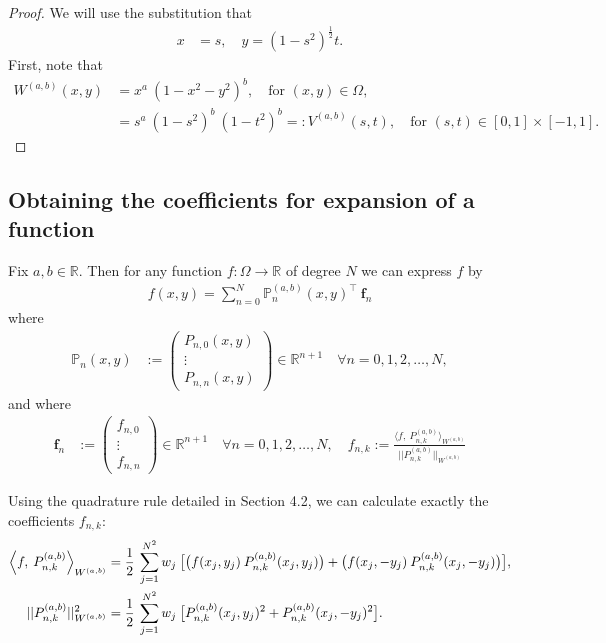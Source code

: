 \documentclass[11pt, oneside]{article}   	%
\newcommand{\half}{\frac{1}{2}}
\newcommand{\R}{\mathbb{R}}
\newcommand{\bigP}{\mathbb{P}}
\newcommand{\Pnk}{P_{n,k}}
\begin{document}
\begin{proof}
We will use the substitution that
\begin{align}
x &= s, \quad y = (1-s^2)^\half t.
\end{align}
First, note that
\begin{align}
W^{(a,b)}(x,y) &= x^a \: (1-x^2-y^2)^b, \quad \text{for } (x,y) \in \Omega, \\
		      &= s^a \: (1-s^2)^{b} \: (1-t^2)^b =: V^{(a,b)}(s,t), \quad \text{for } (s,t) \in [0,1] \times [-1,1].
\end{align}
\end{proof}




\subsection{Obtaining the coefficients for expansion of a function}

Fix \(a,b \in \R\). Then for any function \(f : \Omega \to \R\) of degree $N$ we can express \(f\) by
\begin{align*}
f(x,y) = \sum_{n=0}^N \bigP_n^{(a,b)}(x,y)^\top \: \mathbf{f}_n
\end{align*}
where
\begin{align*}
\bigP_n(x,y) &:= \begin{pmatrix}
		P_{n,0}(x,y) \\
		\vdots \\
		P_{n,n}(x,y)
	\end{pmatrix} \in \R^{n+1} \quad \forall n = 0,1,2,\dots,N,
\end{align*}
and where
\begin{align*}
\mathbf{f}_n &:= \begin{pmatrix}
		f_{n,0} \\
		\vdots \\
		f_{n,n}
	\end{pmatrix} \in \R^{n+1} \quad \forall n = 0,1,2,\dots,N, \quad
f_{n,k} := \frac{\langle f, \: \Pnk^{(a,b)} \rangle_{W^{(a,b)}}}{|| \Pnk^{(a,b)} ||_{W^{(a,b)}}}
\end{align*}

Using the quadrature rule detailed in Section 4.2, we can calculate exactly the coefficients $f_{n,k}$:
\begin{align}
\ip< f, \: \Pnk^{(a,b)} >_{W^{(a,b)}} &= \half \: \sum_{j=1}^{N^2} w_j \: \big[ \big(f(x_j, y_j) \: \Pnk^{(a,b)}(x_j, y_j)\big) +\big(f(x_j, -y_j) \: \Pnk^{(a,b)}(x_j, -y_j)\big) \big], \\
|| \Pnk^{(a,b)} ||_{W^{(a,b)}}^2 &= \half \: \sum_{j=1}^{N^2} w_j \: \big[ \Pnk^{(a,b)}(x_j, y_j)^2 + \Pnk^{(a,b)}(x_j, -y_j)^2 \big].
\end{align}
\end{document}
